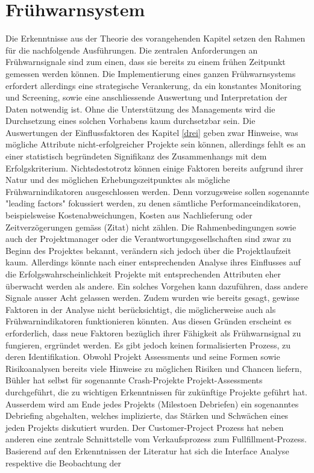 \section{Frühwarnsystem}\label{sec:diskfru}
Die Erkenntnisse aus der Theorie des vorangehenden Kapitel setzen den Rahmen für die nachfolgende Ausführungen. Die zentralen Anforderungen an Frühwarnsignale sind zum einen, dass sie bereits zu einem frühen Zeitpunkt gemessen werden können. Die Implementierung eines ganzen Frühwarnsystems erfordert allerdings eine strategische Verankerung, da ein konstantes Monitoring und Screening, sowie eine anschliessende Auswertung und Interpretation der Daten notwendig ist. Ohne die Unterstützung des Managements wird die Durchsetzung eines solchen Vorhabens kaum durchsetzbar sein.
Die Auswertungen der Einflussfaktoren des Kapitel \ref{drei} geben zwar Hinweise, was mögliche Attribute nicht-erfolgreicher Projekte sein können, allerdings fehlt es an einer statistisch begründeten Signifikanz des Zusammenhangs mit dem Erfolgskriterium. Nichtsdestotrotz können einige Faktoren bereits aufgrund ihrer Natur und des möglichen Erhebungszeitpunktes als mögliche Frühwarnindikatoren ausgeschlossen werden. Denn vorzugsweise sollen sogenannte "leading factors" fokussiert werden, zu denen sämtliche Performanceindikatoren, beispielsweise Kostenabweichungen, Kosten aus Nachlieferung oder Zeitverzögerungen gemäss (Zitat) nicht zählen. Die Rahmenbedingungen sowie auch der Projektmanager oder die Verantwortungsgesellschaften sind zwar zu Beginn des Projektes bekannt, verändern sich jedoch über die Projektlaufzeit kaum. Allerdings könnte nach einer entsprechenden Analyse ihres Einflusses auf die Erfolgswahrscheinlichkeit Projekte mit entsprechenden Attributen eher überwacht werden als andere. Ein solches Vorgehen kann dazuführen, dass andere Signale ausser Acht gelassen werden. Zudem wurden wie bereits gesagt, gewisse Faktoren in der Analyse nicht berücksichtigt, die möglicherweise auch als Frühwarnindikatoren funktionieren könnten. Aus diesen Gründen erscheint es erforderlich, dass neue Faktoren bezüglich ihrer Fähigkeit als Frühwarnsignal zu fungieren, ergründet werden. Es gibt jedoch keinen formalisierten Prozess, zu deren Identifikation. 
\newline
Obwohl Projekt Assessments und seine Formen sowie Risikoanalysen bereits viele Hinweise zu möglichen Risiken und Chancen liefern, Bühler hat selbst für sogenannte Crash-Projekte Projekt-Assessments durchgeführt, die zu wichtigen Erkenntnissen für zukünftige Projekte geführt hat. Ausserdem wird am Ende jedes Projekts (Milestoen Debriefen) ein sogenanntes Debriefing abgehalten, welches implizierte, das Stärken und Schwächen eines jeden Projekts diskutiert wurden. Der Customer-Project Prozess hat neben anderen eine zentrale Schnittstelle vom Verkaufsprozess zum Fullfillment-Prozess. Basierend auf den Erkenntnissen der Literatur hat sich die Interface Analyse respektive die Beobachtung der
